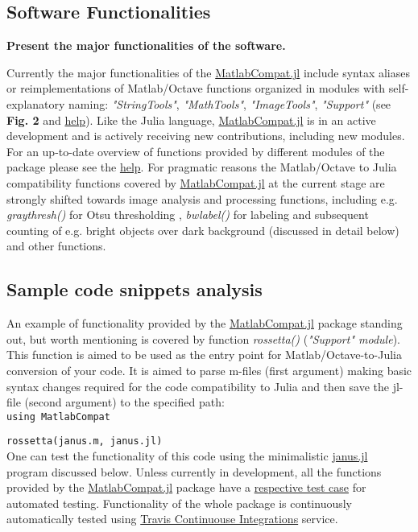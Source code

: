 \subsection{Software Functionalities}

\textbf{Present the major functionalities of the software.}

Currently the major functionalities of the \href{https://github.com/MatlabCompat/MatlabCompat.jl}{MatlabCompat.jl} include syntax aliases or reimplementations of Matlab/Octave functions organized in modules with self-explanatory naming: \textit{"StringTools"}, \textit{"MathTools"}, \textit{"ImageTools"}, \textit{"Support"} (see \textbf{Fig. 2} and \href{http://matlabcompat.github.io/help.html}{help}). Like the Julia language, \href{https://github.com/MatlabCompat/MatlabCompat.jl}{MatlabCompat.jl} is in an active development and is actively receiving new contributions, including new modules. For an up-to-date overview of functions provided by different modules of the package please see the \href{http://matlabcompat.github.io/help.html}{help}. For pragmatic reasons the Matlab/Octave to Julia compatibility functions covered by \href{https://github.com/MatlabCompat/MatlabCompat.jl}{MatlabCompat.jl} at the current stage are strongly shifted towards image analysis and processing functions, including e.g. \textit{graythresh()} for Otsu thresholding \cite{otsu1975threshold}, \textit{bwlabel()} for labeling and subsequent counting of e.g. bright objects over dark background (discussed in detail below) and other functions.

\subsection{Sample code snippets analysis}

An example of functionality provided by the \href{https://github.com/MatlabCompat/MatlabCompat.jl}{MatlabCompat.jl} package standing out, but worth mentioning is covered by function \textit{rossetta()} (\textit{"Support" module}). This function is aimed to be used as the entry point for Matlab/Octave-to-Julia conversion of your code. It is aimed to parse m-files (first argument) making basic syntax changes required for the code compatibility to Julia and then save the jl-file (second argument) to the specified path:\\

\verb|using MatlabCompat|

\verb|rossetta(janus.m, janus.jl)|\\

One can test the functionality of this code using the minimalistic \href{https://github.com/MatlabCompat/MatlabCompat.jl/blob/dev/test/janus.m}{janus.jl} program discussed below. Unless currently in development, all the functions provided by the \href{https://github.com/MatlabCompat/MatlabCompat.jl}{MatlabCompat.jl} package have a \href{https://github.com/MatlabCompat/MatlabCompat.jl/tree/master/test}{respective test case} for automated testing. Functionality of the whole package is continuously automatically tested using \href{https://travis-ci.org/MatlabCompat/MatlabCompat.jl}{Travis Continuouse Integrations} service.
  